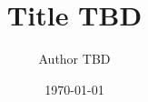 \documentclass[11pt]{article}
\title{Title TBD}
\author{Author TBD}
\date{\today}
\begin{document}
\maketitle

\begin{abstract}
\end{abstract}



\end{document}
